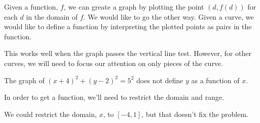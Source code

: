 \documentclass{ximera}
\begin{document}
Given a function, $f$, we can greate a graph by plotting the point $(d, f(d))$ for each $d$ in the domain of $f$. We would like to go the other way.  Given a curve, we would like to define a function by interpreting the plotted points as pairs in the function.

This works well when the graph passes the vertical line test. However, for other curves, we will need to focus our attention on only pieces of the curve.








The graph of $(x+4)^2 + (y-2)^2 = 5^2$ does not define $y$ as a function of $x$.


\begin{image}
\end{image}




In order to get a function, we'll need to restrict the domain and range.


We could restrict the domain, $x$, to $[-4, 1]$, but that doesn't fix the problem.
\end{document}
